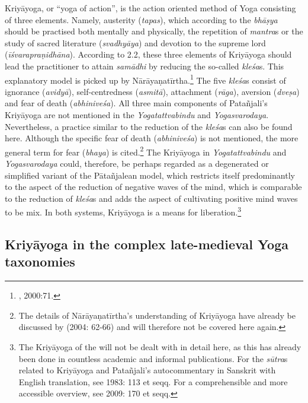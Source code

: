 Kriyāyoga, or ``yoga of action'', is the action oriented method of Yoga consisting of three elements. Namely, austerity (\textit{tapas}), which according to the \textit{bhāṣya} should be practised both mentally and physically, the repetition of \textit{mantra}s or the study of sacred literature (\textit{svadhyāya}) and devotion to the supreme lord (\textit{īśvarapraṇidhāna}).
According to  2.2, these three elements of Kriyāyoga should lead the practitioner to attain \textit{samādhi} by reducing the so-called \textit{kleśa}s. This explanatory model is picked up by Nārāyaṇatīrtha.\footnote{\citeauthor{yogacandrika}, 2000:71.} The five \textit{kleśa}s consist of ignorance (\textit{avidyā}), self-centredness (\textit{asmitā}), attachment (\textit{rāga}), aversion (\textit{dveṣa}) and fear of death (\textit{abhiniveśa}). 
All three main components of Patañjali's Kriyāyoga are not mentioned in the \textit{Yogatattvabindu} and \textit{Yogasvarodaya}. Nevertheless, a practice similar to the reduction of the \textit{kleśa}s can also be found here. Although the specific fear of death (\textit{abhiniveśa}) is not mentioned, the more general term for fear (\textit{bhaya}) is cited.\footnote{The details of Nārāyaṇatīrtha's understanding of Kriyāyoga have already be discussed by \citeauthor{penna2004} (2004: 62-66) and will therefore not be covered here again.}
The Kriyāyoga in \textit{Yogatattvabindu} and \textit{Yogasvarodaya} could, therefore, be perhaps regarded as a degenerated or simplified variant of the Pātañjalean model, which restricts itself predominantly to the aspect of the reduction of negative waves of the mind, which is comparable to the reduction of \textit{kleśa}s and adds the aspect of cultivating positive mind waves to be mix. In both systems, Kriyāyoga is a means for liberation.\footnote{The Kriyāyoga of the  will not be dealt with in detail here, as this has already been done in countless academic and informal publications. For the \textit{sūtra}s related to Kriyāyoga and Patañjali's autocommentary in Sanskrit with English translation, see \citeauthor{yogasutra} 1983: 113 et seqq. For a comprehensible and more accessible overview, see \citeauthor{bryant2009} 2009: 170 et seqq.}

\subsection{Kriyāyoga in the complex late-medieval Yoga taxonomies}

